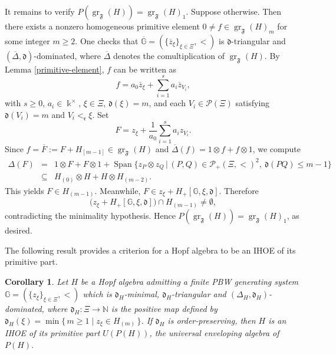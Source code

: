 \documentclass{article}
\makeatletter
\renewenvironment{proof}[1][\proofname]{\par
	\pushQED{\qed}%
	\normalfont \topsep6\p@\@plus6\p@\relax
	\trivlist
	\item[\hskip\labelsep
	\bfseries
	#1\@addpunct{.}]\ignorespaces
}{%
	\popQED\endtrivlist\@endpefalse
}
\theoremstyle{plain}
\newtheorem{corollary}[thm]{Corollary}
\theoremstyle{definition}
\numberwithin{equation}{section}
\DeclareMathOperator{\gr}{gr}
\DeclareMathOperator{\Span}{Span}
\newcommand{\GG}{\mathbb{G}}
\newcommand{\dd}{\mathfrak{d}}
\newcommand{\rr}{\mathfrak{r}}
\makeatother
\begin{document}
\begin{proof}[Proof of Proposition \ref{coradical filtration}]
		It remains to verify $P(\gr_{\mathfrak{F}}(H)) = \gr_{\mathfrak{F}}(H)_{1}$. Suppose otherwise. Then there exists a nonzero homogeneous primitive element $0\neq f\in \gr_{\mathfrak{F}}(H)_{m}$ for some integer $m\geq 2$. One checks that $\overline{\GG}=(\{\overline{z}_{\xi}\}_{\xi\in \Xi}, <)$ is $\dd$-triangular and $(\overline{\Delta}, \dd)$-dominated, where $\overline{\Delta}$ denotes the comultiplication of $\gr_{\mathfrak{F}}(H)$. By Lemma \ref{primitive-element}, $f$ can be written as
		\[
		f= a_{0} \overline{z}_{\xi} + \sum_{i=1}^{s}a_{i}\overline{z}_{V_{i}},
		\]
		with $s\geq 0$, $a_{i} \in \Bbbk^{\times}$, $\xi\in \Xi$, $\dd(\xi)=m$, and each $V_{i} \in \mathcal{P}(\Xi)$ satisfying $\dd(V_{i})=m$ and $V_{i}<_{\rr} \xi$. Set
		\[
		F=z_{\xi} + \frac{1}{a_{0}}\sum_{i=1}^{s} a_{i} z_{V_{i}}.
		\]
		Since $f = \overline{F}:= F + H_{[m-1]} \in \gr_{\mathfrak{F}}(H)$ and $\overline{\Delta}(f) =1\otimes f+f\otimes 1$, we compute
		\begin{eqnarray*}
			\Delta(F) &=& 1\otimes F+F\otimes 1 + \Span\bigl\{z_{P}\otimes z_{Q} \,\big|\, (P,Q) \in \mathcal{P}_{+}(\Xi,<)^{2}, ~ \dd(PQ)\leq m-1 \bigr\} \\
			&\subseteq& H_{(0)}\otimes H + H\otimes H_{(m-2)}.
		\end{eqnarray*}
		This yields $F\in H_{(m-1)}$. Meanwhile, $F\in z_{\xi} + H_{+}[\GG, \xi, \dd]$. Therefore
		\[
		\bigl( z_{\xi} + H_{+}[\GG, \xi, \dd] \bigr) \cap H_{(m-1)} \neq \emptyset,
		\]
		contradicting the minimality hypothesis. Hence $P(\gr_{\mathfrak{F}}(H)) = \gr_{\mathfrak{F}}(H)_{1}$, as desired.
	\end{proof}
	
	The following result provides a criterion for a Hopf algebra to be an IHOE of its primitive part.
	
	\begin{corollary}\label{IHOE-criterion}
		Let $H$ be a Hopf algebra admitting a finite PBW generating system $\GG=(\{z_{\xi}\}_{\xi\in \Xi}, <)$ which is $\dd_{H}$-minimal, $\dd_{H}$-triangular and $(\Delta_{H},\dd_{H})$-dominated, where $\dd_{H}\colon\Xi \to \mathbb{N}$ is the positive map defined by $\dd_{H}(\xi)=\min\{\, m \geq 1 \mid z_{\xi}\in H_{(m)}\,\}$. If $\dd_{H}$ is order-preserving, then $H$ is an IHOE of its primitive part $U(P(H))$, the universal enveloping algebra of $P(H)$.
	\end{corollary}
	
\end{document}
